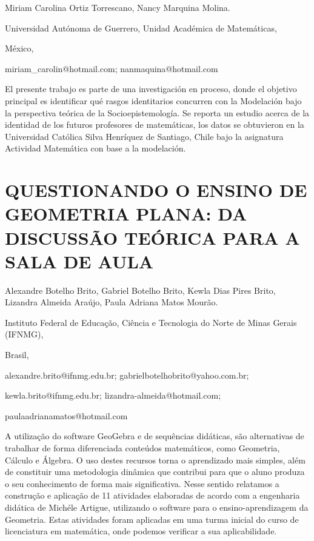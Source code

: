\begin{datos}

Miriam Carolina Ortiz Torrescano, Nancy Marquina Molina.

Universidad Autónoma de Guerrero, Unidad Académica de Matemáticas,

México,

miriam\_carolin@hotmail.com; nanmaquina@hotmail.com 

\end{datos}

El presente trabajo es parte de una investigación en proceso, donde
el objetivo principal es identificar qué rasgos identitarios concurren
con la Modelación bajo la perspectiva teórica de la Socioepistemología.
Se reporta un estudio acerca de la identidad de los futuros profesores
de matemáticas, los datos se obtuvieron en la Universidad Católica
Silva Henríquez de Santiago, Chile bajo la asignatura Actividad Matemática
con base a la modelación.

\setcounter{section}{225}


\section{QUESTIONANDO O ENSINO DE GEOMETRIA PLANA: DA DISCUSSÃO TEÓRICA PARA
A SALA DE AULA}

\begin{datos}

Alexandre Botelho Brito, Gabriel Botelho Brito, Kewla Dias Pires Brito,
Lizandra Almeida Araújo, Paula Adriana Matos Mourão.

Instituto Federal de Educação, Ciência e Tecnologia do Norte de Minas
Gerais (IFNMG),

Brasil,

alexandre.brito@ifnmg.edu.br; gabrielbotelhobrito@yahoo.com.br;

kewla.brito@ifnmg.edu.br; lizandra-almeida@hotmail.com;

paulaadrianamatos@hotmail.com 

\end{datos}

A utilização do software GeoGebra e de sequências didáticas, são alternativas
de trabalhar de forma diferenciada conteúdos matemáticos, como Geometria,
Cálculo e Álgebra. O uso destes recursos torna o aprendizado mais
simples, além de constituir uma metodologia dinâmica que contribui
para que o aluno produza o seu conhecimento de forma mais significativa.
Nesse sentido relatamos a construção e aplicação de 11 atividades
elaboradas de acordo com a engenharia didática de Michéle Artigue,
utilizando o software para o ensino-aprendizagem da Geometria. Estas
atividades foram aplicadas em uma turma inicial do curso de licenciatura
em matemática, onde podemos verificar a sua aplicabilidade.


